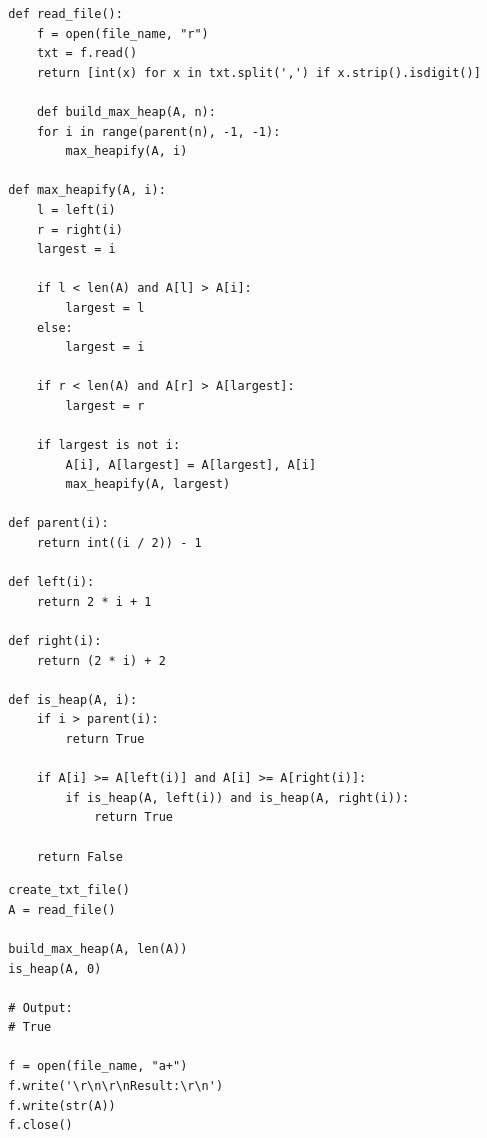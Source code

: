\documentclass{article}
\begin{document}
\begin{enumerate}
\begin{enumerate}
\begin{lstlisting}
  def read_file():
      f = open(file_name, "r")
      txt = f.read()
      return [int(x) for x in txt.split(',') if x.strip().isdigit()]

      def build_max_heap(A, n):
      for i in range(parent(n), -1, -1): 
          max_heapify(A, i) 
  
  def max_heapify(A, i):    
      l = left(i)
      r = right(i)
      largest = i
  
      if l < len(A) and A[l] > A[i]:
          largest = l
      else:
          largest = i
          
      if r < len(A) and A[r] > A[largest]:
          largest = r
  
      if largest is not i:
          A[i], A[largest] = A[largest], A[i]        
          max_heapify(A, largest)
  
  def parent(i):
      return int((i / 2)) - 1
          
  def left(i):
      return 2 * i + 1
  
  def right(i):
      return (2 * i) + 2
  
  def is_heap(A, i): 
      if i > parent(i):  
          return True  
      
      if A[i] >= A[left(i)] and A[i] >= A[right(i)]:
          if is_heap(A, left(i)) and is_heap(A, right(i)):
              return True
        
      return False          
        \end{lstlisting}

        \begin{lstlisting}
  create_txt_file()
  A = read_file()     
  
  build_max_heap(A, len(A))
  is_heap(A, 0)
  
  # Output:
  # True

  f = open(file_name, "a+")
  f.write('\r\n\r\nResult:\r\n')
  f.write(str(A))
  f.close()      
        \end{lstlisting}

  \end{enumerate}

  \end{enumerate}  %
\end{document}
